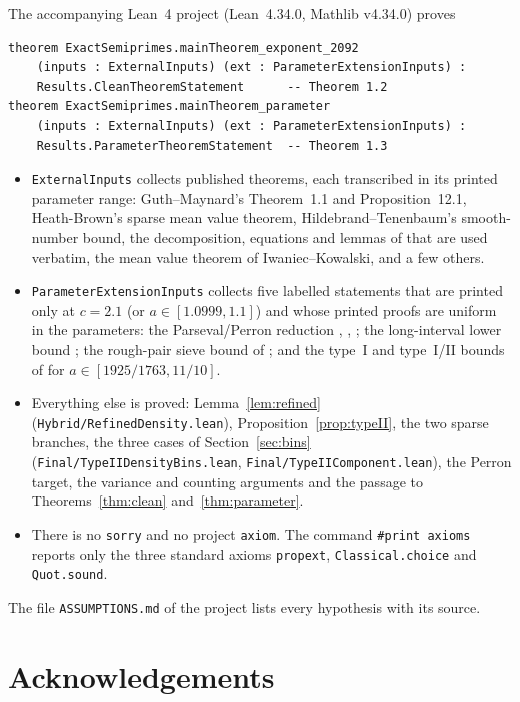 \documentclass[11pt,a4paper]{amsart}
\theoremstyle{definition}
\newcommand{\1}{\mathbf 1}
\newcommand{\lean}[1]{\texttt{#1}}
\begin{document}
The accompanying Lean~4 project (Lean~4.34.0, Mathlib v4.34.0) proves
\begin{verbatim}
theorem ExactSemiprimes.mainTheorem_exponent_2092
    (inputs : ExternalInputs) (ext : ParameterExtensionInputs) :
    Results.CleanTheoremStatement      -- Theorem 1.2
theorem ExactSemiprimes.mainTheorem_parameter
    (inputs : ExternalInputs) (ext : ParameterExtensionInputs) :
    Results.ParameterTheoremStatement  -- Theorem 1.3
\end{verbatim}
\begin{itemize}[leftmargin=*]
\item \lean{ExternalInputs} collects published theorems, each transcribed
  in its printed parameter range: Guth--Maynard's Theorem~1.1 and
  Proposition~12.1, Heath-Brown's sparse mean value theorem,
  Hildebrand--Tenenbaum's smooth-number bound, the decomposition,
  equations and lemmas of \cite{MT} that are used verbatim, the mean
  value theorem of Iwaniec--Kowalski, and a few others.
\item \lean{ParameterExtensionInputs} collects five labelled statements
  that are printed only at \(c=2.1\) (or \(a\in[1.0999,1.1]\)) and whose
  printed proofs are uniform in the parameters: the Parseval/Perron
  reduction \cite[Lemma~14]{MR}, \cite[Lemma~1]{Ter}, \cite[Lemma~3.1]{MT};
  the long-interval lower bound \cite[Theorem~2.1(ii)]{MT}; the rough-pair
  sieve bound of \cite[Section~5]{MT}; and the type~I and type~I/II
  bounds of \cite[Sections~5.1, 5.2]{MT} for
  \(a\in[1925/1763,11/10]\).
\item Everything else is proved: Lemma~\ref{lem:refined}
  (\lean{Hybrid/RefinedDensity.lean}), Proposition~\ref{prop:typeII},
  the two sparse branches, the three cases of Section~\ref{sec:bins}
  (\lean{Final/TypeIIDensityBins.lean}, \lean{Final/TypeIIComponent.lean}),
  the Perron target, the variance and counting arguments and the
  passage to Theorems~\ref{thm:clean} and~\ref{thm:parameter}.
\item There is no \lean{sorry} and no project \lean{axiom}.  The
  command \lean{\#print axioms} reports only the three standard axioms
  \lean{propext}, \lean{Classical.choice} and \lean{Quot.sound}.
\end{itemize}
The file \lean{ASSUMPTIONS.md} of the project lists every hypothesis
with its source.

\section*{Acknowledgements}
\end{document}
